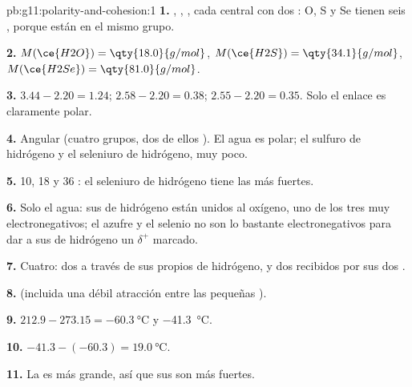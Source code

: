 \begin{solution}{pb:g11:polarity-and-cohesion:1}
\textbf{1.} , , , cada  central con
dos : O, S y Se tienen seis ,
porque están en el mismo grupo.

\textbf{2.} $M(\ce{H2O}) = \qty{18.0}{g/mol}$, $M(\ce{H2S}) =
\qty{34.1}{g/mol}$, $M(\ce{H2Se}) = \qty{81.0}{g/mol}$.

\textbf{3.} $3.44 - 2.20 = 1.24$; $2.58 - 2.20 = 0.38$;
$2.55 - 2.20 = 0.35$. Solo el enlace  es claramente polar.

\textbf{4.} Angular (cuatro grupos, dos de ellos ).
El agua es polar; el sulfuro de hidrógeno y el seleniuro de hidrógeno,
muy poco.

\textbf{5.} 10, 18 y 36 : el seleniuro de hidrógeno tiene las
 más fuertes.

\textbf{6.} Solo el agua: sus  de hidrógeno están unidos al
oxígeno, uno de los tres  muy electronegativos; el azufre y el
selenio no son lo bastante electronegativos para dar a sus  de
hidrógeno un $\delta^+$ marcado.

\textbf{7.} Cuatro: dos a través de sus propios  de hidrógeno, y
dos recibidos por sus dos .

\textbf{8.}  (incluida una débil
atracción entre las pequeñas ).

\textbf{9.} $212.9 - 273.15 = \qty{-60.3}{\celsius}$ y
\qty{-41.3}{\celsius}.

\textbf{10.} $-41.3 - (-60.3) = \qty{19.0}{\celsius}$.

\textbf{11.} La  es más grande, así que sus  son más fuertes.


\end{solution}
